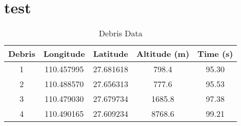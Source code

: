 \appendix
\section{test}

\begin{table}[h]
    \centering
    \begin{tabular}{ccccc}
        \hline
        \textbf{Debris} & \textbf{Longitude} & \textbf{Latitude} & \textbf{Altitude (m)} & \textbf{Time (s)} \\ \hline
        1 & 110.457995 & 27.681618 & 798.4 & 95.30 \\ 
        2 & 110.488570 & 27.656313 & 777.6 & 95.53 \\ 
        3 & 110.479030 & 27.679734 & 1685.8 & 97.38 \\ 
        4 & 110.490165 & 27.609234 & 8768.6 & 99.21 \\ \hline
    \end{tabular}
    \caption{Debris Data}
    \label{tab:debris}
\end{table}